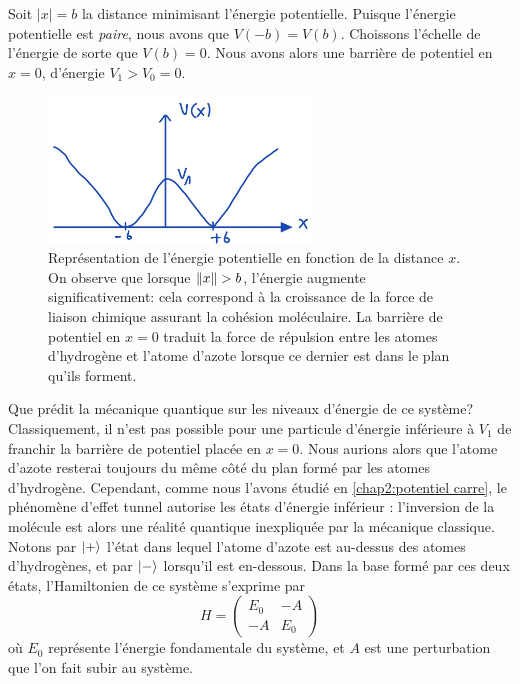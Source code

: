 \documentclass[../notesdecours.tex]{subfiles}
\begin{document}
Soit $|x| = b$ la distance minimisant l'énergie potentielle. Puisque l'énergie potentielle est \emph{paire}, nous avons que $V(-b) = V(b)$. Choissons l'échelle de l'énergie de sorte que $V(b) = 0$. Nous avons alors une barrière de potentiel en $x = 0$, d'énergie $V_1 > V_0 = 0$.\\

\begin{figure}[h]
    \centering
    \includegraphics[width=70mm,scale=0.5]{Chapitre 5/Figure 2.jpg}
    \caption{Représentation de l'énergie potentielle en fonction de la distance $x$. On observe que lorsque $\norm{x}>b$, l'énergie augmente significativement: cela correspond à la croissance de la force de liaison chimique assurant la cohésion moléculaire. La barrière de potentiel en $x = 0$ traduit la force de répulsion entre les atomes d'hydrogène et l'atome d'azote lorsque ce dernier est dans le plan qu'ils forment.}
\end{figure}

Que prédit la mécanique quantique sur les niveaux d'énergie de ce système? Classiquement, il n'est pas possible pour une particule d'énergie inférieure à $V_1$ de franchir la barrière de potentiel placée en $x=0$. Nous aurions alors que l'atome d'azote resterai toujours du même côté du plan formé par les atomes d'hydrogène. Cependant, comme nous l'avons étudié en \ref{chap2:potentiel carre}, le phénomène d'effet tunnel autorise les états d'énergie inférieur : l'inversion de la molécule est alors une réalité quantique inexpliquée par la mécanique classique.\\

Notons par $\ket{+}$ l'état dans lequel l'atome d'azote est au-dessus des atomes d'hydrogènes, et par $\ket{-}$ lorsqu'il est en-dessous. Dans la base formé par ces deux états, l'Hamiltonien de ce système s'exprime par
\begin{equation}
    H = 
    \begin{pmatrix}
        E_0 & -A\\
        -A & E_0
    \end{pmatrix}\label{eq:Hamiltonien applications}
\end{equation}
où $E_0$ représente l'énergie fondamentale du système, et $A$ est une perturbation que l'on fait subir au système.\\
\end{document}

